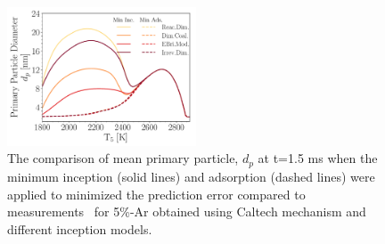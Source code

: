 
\begin{figure}[H]
	\centering
	\includegraphics[width=0.5\textwidth]{Figures/Results/Shocktube/Agafonov2016_cpr/d_p_maxincads_combined.pdf}
	\caption{The comparison of mean primary particle, $d_p$ at t=1.5 ms when the minimum inception (solid lines) and adsorption (dashed lines) were applied to minimized the prediction error compared to measurements~\citep{agafonov2016unified} for 5\%-Ar obtained using Caltech mechanism and different inception models.}
	\label{fig:shockagof_dp_maxincads_cpr} 
\end{figure}


